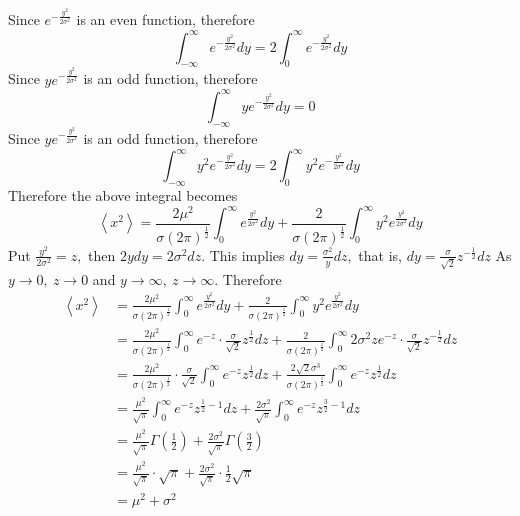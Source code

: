 Since $e^{-\frac{y^{2}}{2 \sigma^{2}}}$ is an even function, therefore
$$
\int_{-\infty}^{\infty} e^{-\frac{y^{2}}{2 \sigma^{2}}} d y=2 \int_{0}^{\infty} e^{-\frac{y^{2}}{2 \sigma^{2}}} d y
$$
Since $y e^{-\frac{y^{2}}{2 \sigma^{2}}}$ is an odd function, therefore
$$
\int_{-\infty}^{\infty} y e^{-\frac{y^{2}}{2 \sigma^{2}}} d y=0
$$
Since $y e^{-\frac{y^{2}}{2 \sigma^{2}}}$ is an odd function, therefore
$$
\int_{-\infty}^{\infty} y^{2} e^{-\frac{y^{2}}{2 \sigma^{2}}} d y=2 \int_{0}^{\infty} y^{2} e^{-\frac{y^{2}}{2 \sigma^{2}}} d y
$$
Therefore the above integral becomes
$$
\left\langle x^{2}\right\rangle=\frac{2 \mu^{2}}{\sigma(2 \pi)^{\frac{1}{2}}} \int_{0}^{\infty} e^{\frac{y^{2}}{2 \sigma^{2}}} d y+\frac{2}{\sigma(2 \pi)^{\frac{1}{2}}} \int_{0}^{\infty} y^{2} e^{\frac{y^{2}}{2 \sigma^{2}}} d y
$$
Put $\frac{y^{2}}{2 \sigma^{2}}=z,$ then $2 y d y=2 \sigma^{2} d z$. This implies $d y=\frac{\sigma^{2}}{y} d z,$ that is, $d y=\frac{\sigma}{\sqrt{2}} z^{-\frac{1}{2}} d z$
As $y \rightarrow 0, \  z \rightarrow 0$ and $y \rightarrow \infty, \  z \rightarrow \infty$. Therefore
$$
\begin{aligned}
\left\langle x^{2}\right\rangle&=\frac{2 \mu^{2}}{\sigma(2 \pi)^{\frac{1}{2}}} \int_{0}^{\infty} e^{\frac{y^{2}}{2 \sigma^{2}}} d y+\frac{2}{\sigma(2 \pi)^{\frac{1}{2}}} \int_{0}^{\infty} y^{2} e^{\frac{y^{2}}{2 \sigma^{2}}} d y \\
&=\frac{2 \mu^{2}}{\sigma(2 \pi)^{\frac{1}{2}}} \int_{0}^{\infty} e^{-z} \cdot \frac{\sigma}{\sqrt{2}} z^{\frac{1}{2}} d z+\frac{2}{\sigma(2 \pi)^{\frac{1}{2}}} \int_{0}^{\infty} 2 \sigma^{2} z e^{-z} \cdot \frac{\sigma}{\sqrt{2}} z^{-\frac{1}{2}} d z \\
&=\frac{2 \mu^{2}}{\sigma(2 \pi)^{\frac{1}{2}}} \cdot \frac{\sigma}{\sqrt{2}} \int_{0}^{\infty} e^{-z} z^{\frac{1}{2}} d z+\frac{2 \sqrt{2} \sigma^{3}}{\sigma(2 \pi)^{\frac{1}{2}}} \int_{0}^{\infty} e^{-z} z^{\frac{1}{2}} d z \\
&=\frac{\mu^{2}}{\sqrt{\pi}} \int_{0}^{\infty} e^{-z} z^{\frac{1}{2}-1} d z+\frac{2 \sigma^{2}}{\sqrt{\pi}} \int_{0}^{\infty} e^{-z} z^{\frac{3}{2}-1} d z \\
&=\frac{\mu^{2}}{\sqrt{\pi}} \Gamma\left(\frac{1}{2}\right)+\frac{2 \sigma^{2}}{\sqrt{\pi}} \Gamma\left(\frac{3}{2}\right) \\
&=\frac{\mu^{2}}{\sqrt{\pi}} \cdot \sqrt{\pi}+\frac{2 \sigma^{2}}{\sqrt{\pi}} \cdot \frac{1}{2} \sqrt{\pi} \\
&=\mu^{2}+\sigma^{2} \\
\end{aligned}
$$

